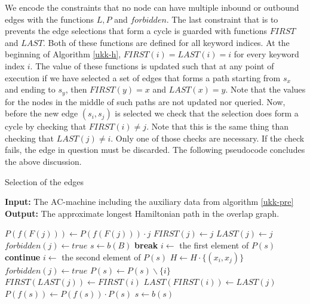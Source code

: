 \documentclass[english,twoside,censored,csm,algorithms-track-2020]{HYthesisML}
\theoremstyle{plain}
\theoremstyle{definition}
\begin{document}
We encode the constraints that no node can have multiple inbound or outbound edges
with the functions $L, P$ and $forbidden$. The last constraint that is to prevents the edge selections
that form a cycle is guarded with functions $FIRST$ and $LAST$. Both of these functions are defined
for all keyword indices. At the beginning of Algorithm \ref{ukk-h}, $FIRST(i) = LAST(i) = i$
for every keyword index $i$. The value of these functions is updated such that at any point of execution
if we have selected a set of edges that forms a path starting from $s_x$ and ending to $s_y$, then
$FIRST(y)=x$ and $LAST(x)=y$. Note that the values for the nodes in the middle of such paths are
not updated nor queried. Now, before the new edge $(s_i,s_j)$ is selected we check that the
selection does form a cycle by checking that $FIRST(i) \neq j$. Note that this is the same thing
than checking that $LAST(j) \neq i$. Only one of those checks are necessary. If the check fails,
the edge in question must be discarded. The following pseudocode concludes the above discussion.


  \begin{algorithm}[h!]
    \caption{Selection of the edges} \label{ukk-h}
    \hspace*{\algorithmicindent} \textbf{Input:} The AC-machine including the auxiliary data from algorithm \ref{ukk-pre} \\
    \hspace*{\algorithmicindent} \textbf{Output:} The approximate longest Hamiltonian path in the overlap graph.
    \begin{algorithmic}[1]
            \State $P(f(F(j)))\gets P(f(F(j)))\cdot {j}$
            \State $FIRST(j)\gets j$
            \State $LAST(j)\gets j$
          \Else
            \State $forbidden(j)\gets true$
          \EndIf
        \EndFor  
        \State $s\gets b(B)$
                \State \textbf{break}
              \EndIf
              \State $i\gets$ the first element of $P(s)$
                  \State \textbf{continue}
                \Else
                  \State $i\gets$ the second element of $P(s)$
                \EndIf
              \EndIf  
              \State $H\gets H\cdot \{(x_i,x_j)\}$
              \State $forbidden(j)\gets true$
              \State $P(s)\gets P(s) \backslash\{i\}$
              \State $FIRST(LAST(j))\gets FIRST(i)$
              \State $LAST(FIRST(i))\gets LAST(j)$
            \EndFor
          \State $P(f(s))\gets P(f(s))\cdot P(s)$
          \EndIf
          \State $s\gets b(s)$
        \EndWhile
      \EndFunction
    \end{algorithmic}
  \end{algorithm}
\end{document}
